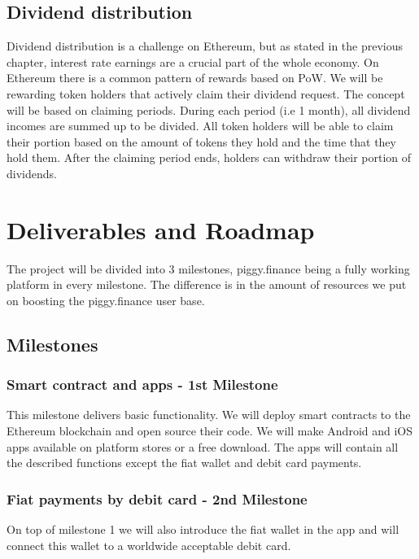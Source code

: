 \documentclass[english]{article}
\begin{document}
\subsection{Dividend distribution}
Dividend distribution is a challenge on Ethereum, but as stated in the previous chapter, interest rate earnings are a crucial part of the whole economy. On Ethereum there is a common pattern of rewards based on PoW. We will be rewarding token holders that actively claim their dividend request. The concept will be based on claiming periods. During each period (i.e 1 month), all dividend incomes are summed up to be divided. All token holders will be able to claim their portion based on the amount of tokens they hold and the time that they hold them. After the claiming period ends, holders can withdraw their portion of dividends.


\section{Deliverables and Roadmap}

The project will be divided into 3 milestones, piggy.finance being a fully working platform in every milestone. The difference is in the amount of resources we put on boosting the piggy.finance user base.

\subsection{Milestones}
\subsubsection{Smart contract and apps - 1st Milestone}
This milestone delivers basic functionality. We will deploy smart contracts to the Ethereum blockchain and open source their code. We will make Android and iOS apps available on platform stores or a free download. The apps will contain all the described functions except the fiat wallet and debit card payments.

\subsubsection{Fiat payments by debit card - 2nd Milestone}
On top of milestone 1 we will also introduce the fiat wallet in the app and will connect this wallet to a worldwide acceptable debit card.
\end{document}
